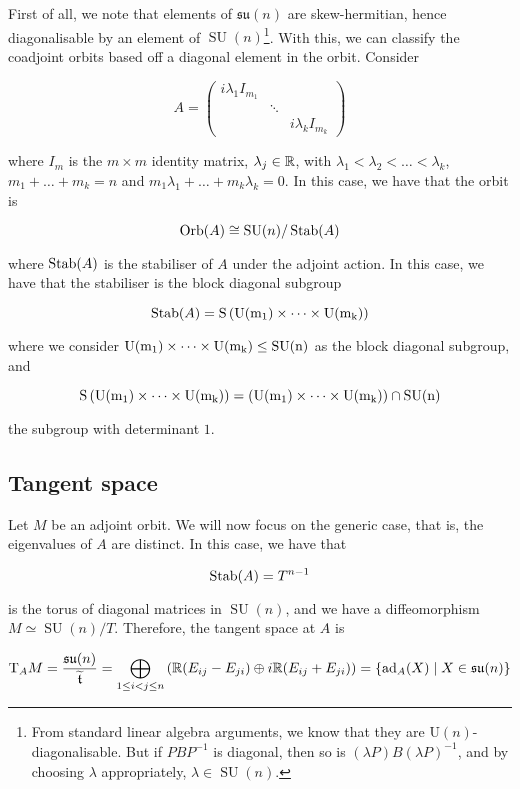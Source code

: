 \documentclass{article}
\DeclareMathOperator{\SU}{SU}
\newcommand{\su}{\mathfrak{su}}
\renewcommand{\tilde}{\widetilde}
\begin{document}
First of all, we note that elements of \(\su(n)\) are skew-hermitian, hence diagonalisable by an element of \(\SU(n)\)\footnote{From standard linear algebra arguments, we know that they are \(\mathrm U(n)\)-diagonalisable. But if \(PBP^{-1}\) is diagonal, then so is \((\lambda P)B(\lambda P)^{-1}\), and by choosing \(\lambda\) appropriately, \(\lambda \in \SU(n)\).}. With this, we can classify the coadjoint orbits based off a diagonal element in the orbit. Consider

\[A = \begin{pmatrix}
    i\lambda_1 I_{m_1} \\
    & \ddots \\
    & & i\lambda_k I_{m_k}
\end{pmatrix}\]

where \(I_m\) is the \(m \times m\) identity matrix, \(\lambda_j \in \mathbb{R}\), with \(\lambda_1 < \lambda_2 < \dots < \lambda_k\), \(m_1 + \dots + m_k = n\) and \(m_1\lambda_1 + \dots + m_k\lambda_k = 0\). In this case, we have that the orbit is

\[\Orb(A) \cong \SU(n)/\Stab(A)\]

where \(\operatorname{Stab}(A)\) is the stabiliser of \(A\) under the adjoint action. In this case, we have that the stabiliser is the block diagonal subgroup

\[\operatorname{Stab}(A) = \rm S\left(\rm U(m_1) \times \dots \times \rm U(m_k)\right)\]

where we consider \(\rm U(m_1) \times \cdots \times \rm U(m_k) \le \SU(n)\) as the block diagonal subgroup, and

\[\rm S\left(\rm U(m_1) \times \dots \times \rm U(m_k)\right) = \left(\rm U(m_1) \times \cdots \times \rm U(m_k)\right) \cap \SU(n)\]

the subgroup with determinant \(1\).

\subsection{Tangent space}

Let \(M\) be an adjoint orbit. We will now focus on the generic case, that is, the eigenvalues of \(A\) are distinct. In this case, we have that

\[\operatorname{Stab}(A) = T^{n-1}\]

is the torus of diagonal matrices in \(\SU(n)\), and we have a diffeomorphism \(M \simeq \SU(n)/T\). Therefore, the tangent space at \(A\) is

\[\TT_AM = \frac{\su(n)}{\tilde \mft} = \bigoplus_{1 \le i < j \le n} \left(\R(E_{ij} - E_{ji}) \oplus i\R (E_{ij} + E_{ji})\right) = \{\ad_A(X) \mid X \in \su(n)\}\]
\end{document}
